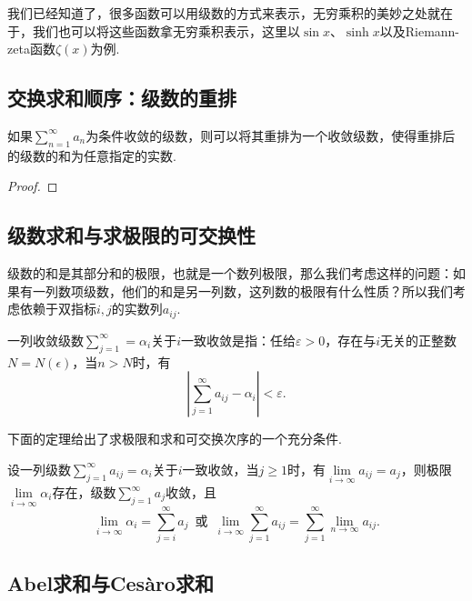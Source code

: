     我们已经知道了，很多函数可以用级数的方式来表示，无穷乘积的美妙之处就在于，我们也可以将这些函数拿无穷乘积表示，这里以\(\sin x\)、\(\sinh x\)以及Riemann-zeta函数\(\zeta(x)\)为例.
    \subsection{交换求和顺序：级数的重排}
    \begin{theorem}[Riemann]
        如果\(\sum\limits_{n=1}^{\infty}a_n\)为条件收敛的级数，则可以将其重排为一个收敛级数，使得重排后的级数的和为任意指定的实数.
    \end{theorem}
    \begin{proof}
        
    \end{proof}
    \subsection{级数求和与求极限的可交换性}
    
    级数的和是其部分和的极限，也就是一个数列极限，那么我们考虑这样的问题：如果有一列数项级数，他们的和是另一列数，这列数的极限有什么性质？所以我们考虑依赖于双指标\(i,j\)的实数列\({a_{ij}}\).
    \begin{definition}[级数的一致收敛]
        一列收敛级数\(\sum\limits_{j = 1}^{\infty}=\alpha_i\)关于\(i\)一致收敛是指：任给\(\varepsilon>0\)，存在与\(i\)无关的正整数\(N = N(\epsilon)\)，当\(n>N\)时，有\[\left|\sum_{j=1}^{\infty}a_{ij}-\alpha_i\right|<\varepsilon.\]
    \end{definition}
    
    下面的定理给出了求极限和求和可交换次序的一个充分条件.
    \begin{theorem}
        设一列级数\(\sum\limits_{j=1}^{\infty}a_{ij}=\alpha_i\)关于\(i\)一致收敛，当\(j\geq1\)时，有\(\lim\limits_{i\to\infty}a_{ij}=a_j\)，则极限\(\lim\limits_{i\to\infty}\alpha_i\)存在，级数\(\sum\limits_{j=1}^{\infty}a_j\)收敛，且\[\lim_{i\to\infty}\alpha_i = \sum_{j=i}^{\infty}a_j\enspace\text{或}\enspace\lim_{i\to\infty} \sum_{j=1}^{\infty}a_{ij} = \sum_{j=1}^{\infty}\lim_{n\to\infty}a_{ij}.\]
    \end{theorem}
    \subsection{Abel求和与Ces\`{a}ro求和}
    \begin{definition}[Abel求和]
        
    \end{definition}

